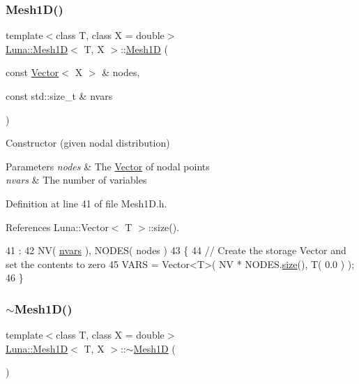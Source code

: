 \subsubsection{\texorpdfstring{Mesh1\+D()}{Mesh1D()}\hspace{0.1cm}{\footnotesize\ttfamily [2/2]}}
{\footnotesize\ttfamily template$<$class T, class X = double$>$ \\
\hyperlink{classLuna_1_1Mesh1D}{Luna\+::\+Mesh1D}$<$ T, X $>$\+::\hyperlink{classLuna_1_1Mesh1D}{Mesh1D} (\begin{DoxyParamCaption}\item[{const \hyperlink{classLuna_1_1Vector}{Vector}$<$ X $>$ \&}]{nodes,  }\item[{const std\+::size\+\_\+t \&}]{nvars }\end{DoxyParamCaption})\hspace{0.3cm}{\ttfamily [inline]}}



Constructor (given nodal distribution) 


\begin{DoxyParams}{Parameters}
{\em nodes} & The \hyperlink{classLuna_1_1Vector}{Vector} of nodal points \\
\hline
{\em nvars} & The number of variables \\
\hline
\end{DoxyParams}


Definition at line 41 of file Mesh1\+D.\+h.



References Luna\+::\+Vector$<$ T $>$\+::size().


\begin{DoxyCode}
41                                                              :
42         NV( \hyperlink{classLuna_1_1Mesh1D_a6cf5a08c5464bc7de45376cf3f5c1a68}{nvars} ), NODES( nodes )
43     \{
44       \textcolor{comment}{// Create the storage Vector and set the contents to zero}
45       VARS = Vector<T>( NV * NODES.\hyperlink{classLuna_1_1Vector_ac9b6ed7a0df401728f27c193fbc8f4d8}{size}(), T( 0.0 ) );
46     \}
\end{DoxyCode}
\mbox{\label{classLuna_1_1Mesh1D_afa5fc0086cfba00000b492fcde59e12f}} 
\subsubsection{\texorpdfstring{$\sim$\+Mesh1\+D()}{~Mesh1D()}}
{\footnotesize\ttfamily template$<$class T, class X = double$>$ \\
\hyperlink{classLuna_1_1Mesh1D}{Luna\+::\+Mesh1D}$<$ T, X $>$\+::$\sim$\hyperlink{classLuna_1_1Mesh1D}{Mesh1D} (\begin{DoxyParamCaption}{ }\end{DoxyParamCaption})\hspace{0.3cm}{\ttfamily [inline]}}



